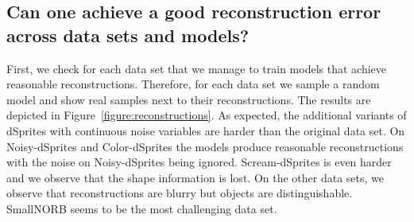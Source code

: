 \subsection{Can one achieve a good reconstruction error across data sets and models?}
First, we check for each data set that we manage to train models that achieve reasonable reconstructions. 
Therefore, for each data set we sample a random model and show real samples next to their reconstructions.
The results are depicted in Figure~\ref{figure:reconstructions}. 
As expected, the additional variants of dSprites with continuous noise variables are harder than the original data set.
On Noisy-dSprites and Color-dSprites the models produce reasonable reconstructions with the noise on Noisy-dSprites being ignored.
Scream-dSprites is even harder and we observe that the shape information is lost.
On the other data sets, we observe that reconstructions are blurry but objects are distinguishable. 
SmallNORB seems to be the most challenging data set.
